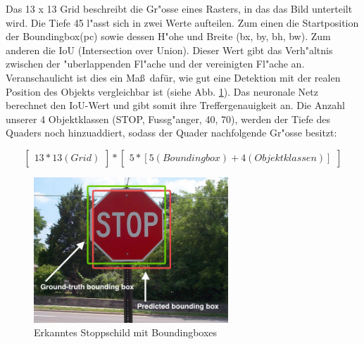 Das 13 x 13 Grid beschreibt die Gr"osse eines Rasters, in das das Bild unterteilt wird. Die Tiefe 45 l"asst sich in zwei Werte aufteilen. Zum einen die Startposition der Boundingbox(pc) sowie dessen H"ohe und Breite (bx, by, bh, bw).  Zum anderen die IoU (Intersection over Union). Dieser Wert gibt das Verh"altnis zwischen der "uberlappenden Fl"ache und der vereinigten Fl"ache an. Veranschaulicht ist dies ein Ma\ss \ daf\"ur, wie gut eine Detektion mit der realen Position des Objekts vergleichbar ist (siehe Abb. \ref{fig:stoppschild}). Das neuronale Netz berechnet den IoU-Wert und gibt somit ihre Treffergenauigkeit an. Die Anzahl unserer 4 Objektklassen (STOP, Fussg"anger, 40, 70),  werden der Tiefe des Quaders noch hinzuaddiert,
sodass der Quader nachfolgende Gr"osse besitzt:


\begin{equation}
\begin{bmatrix}13 * 13 (Grid)\end{bmatrix} * \begin{bmatrix}5 * [ 5 (Boundingbox) + 4 (Objektklassen)]\end{bmatrix}
\end{equation}

\begin{figure}[h]
	\centering
	\includegraphics[width=0.65\textwidth]{images/stoppschild}
	\caption{Erkanntes Stoppschild mit Boundingboxes}
	\label{fig:stoppschild}
\end{figure}


